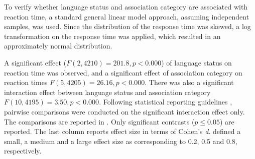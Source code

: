 \documentclass[output=paper,colorlinks,citecolor=brown,nonflat]{langsci/langscibook}
\begin{document}
To verify whether language status and association category are associated with reaction time, a standard general linear model approach, assuming independent samples, was used. Since the distribution of the response time was skewed, a log transformation on the response time was applied, which resulted in an approximately normal distribution.

A significant effect ($F(2, 4210) = 201.8, p < 0.000$) of language status on reaction time was observed, and a significant effect of association category on reaction times $F(5, 4205) = 26.16, p < 0.000$. There was also a significant interaction effect between language status and association category $F(10, 4195) = 3.50, p < 0.000$. Following statistical reporting guidelines \citep{FieldEtAl2012}, pairwise comparisons were conducted on the significant interaction effect only. The comparisons are reported in . Only significant contrasts ($p \leq 0.05$) are reported. The last column reports effect size in terms of Cohen’s \textit{d}. \citet{Cohen1988} defined a small, a medium and a large effect size as corresponding to 0.2, 0.5 and 0.8, respectively.
\end{document}
